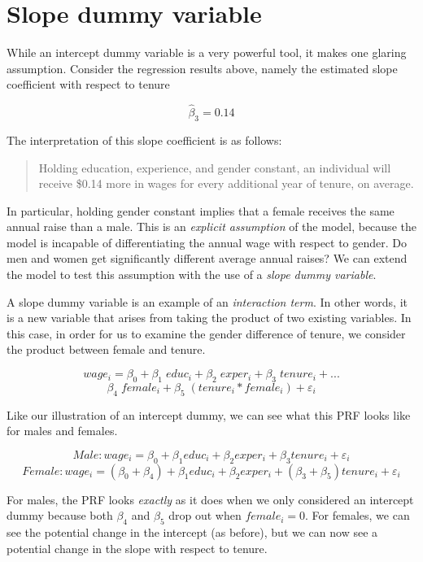 \documentclass[
]{book}
\begin{document}
\section{Slope dummy variable}\label{slope-dummy-variable}

While an intercept dummy variable is a very powerful tool, it makes one glaring assumption. Consider the regression results above, namely the estimated slope coefficient with respect to tenure

\[\hat{\beta}_3 = 0.14\]

The interpretation of this slope coefficient is as follows:

\begin{quote}
Holding education, experience, and gender constant, an individual will receive \$0.14 more in wages for every additional year of tenure, on average.
\end{quote}

In particular, holding gender constant implies that a female receives the same annual raise than a male. This is an \emph{explicit assumption} of the model, because the model is incapable of differentiating the annual wage with respect to gender. Do men and women get significantly different average annual raises? We can extend the model to test this assumption with the use of a \emph{slope dummy variable}.

A slope dummy variable is an example of an \emph{interaction term}. In other words, it is a new variable that arises from taking the product of two existing variables. In this case, in order for us to examine the gender difference of tenure, we consider the product between female and tenure.

\[wage_i = \beta_0+\beta_1\;educ_i+\beta_2\;exper_i+\beta_3\;tenure_i+...\]
\[\beta_4\;female_i+\beta_5\;(tenure_i*female_i)+\varepsilon_i\]

Like our illustration of an intercept dummy, we can see what this PRF looks like for males and females.

\[Male: wage_i=\beta_0+\beta_1educ_i+\beta_2exper_i+\beta_3tenure_i+\varepsilon_i\]
\[Female: wage_i=(\beta_0+\beta_4)+\beta_1educ_i+\beta_2exper_i+(\beta_3+\beta_5)tenure_i+\varepsilon_i\]

For males, the PRF looks \emph{exactly} as it does when we only considered an intercept dummy because both \(\beta_4\) and \(\beta_5\) drop out when \(female_i = 0\). For females, we can see the potential change in the intercept (as before), but we can now see a potential change in the slope with respect to tenure.
\end{document}
